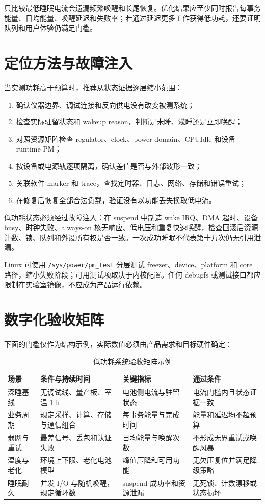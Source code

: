 只比较最低睡眠电流会遗漏频繁唤醒和长尾恢复。优化结果应至少同时报告每事务能量、日均能量、唤醒延迟和失败率；若通过延迟更多工作获得低功耗，还要证明队列和用户体验仍满足门槛。

\section{定位方法与故障注入}

当实测功耗高于预算时，推荐从状态证据逐层缩小范围：

\begin{enumerate}
  \item 确认仪器边界、调试连接和反向供电没有改变被测系统；
  \item 检查实际驻留状态和 wakeup reason，判断是未睡、浅睡还是立即唤醒；
  \item 对照资源矩阵检查 regulator、clock、power domain、CPUIdle 和设备 runtime PM；
  \item 按设备或电源轨逐项隔离，确认差值是否与外部波形一致；
  \item 关联软件 marker 和 trace，查找定时器、日志、网络、存储和错误重试；
  \item 在修复后恢复全部合法负载，验证没有以功能丢失换取低电流。
\end{enumerate}

低功耗状态必须经过故障注入：在 suspend 中制造 wake IRQ、DMA 超时、设备 busy、时钟失败、always-on 核无响应、低电压和重复快速唤醒，检查回滚后资源计数、锁、队列和外设所有权是否一致。一次成功睡眠不代表第十万次仍无引用泄漏。

Linux 可使用 \texttt{/sys/power/pm\_test} 分层测试 freezer、device、platform 和 core 路径，缩小失败阶段；可用测试项取决于内核配置。任何 debugfs 或测试接口都应限制在实验室镜像，不应成为产品运行依赖。

\section{数字化验收矩阵}

下面的门槛仅作为结构示例，实际数值必须由产品需求和目标硬件确定：

\begin{table}[H]
  \centering
  \caption{低功耗系统验收矩阵示例}
  \begin{tabular}{p{27mm}p{43mm}p{30mm}p{28mm}}
    \hline
    场景 & 条件与持续时间 & 关键指标 & 通过条件 \\
    \hline
    深睡基线 & 无调试线、量产板、室温 1 h & 电池侧电流与驻留状态 & 电流门槛内且状态证据一致 \\
    业务周期 & 规定采样、计算、存储与通信组合 & 每事务能量与完成时间 & 能量和延迟均不超预算 \\
    弱网与重试 & 最差信号、丢包和认证失败 & 日均能量与唤醒次数 & 不形成无界重试或唤醒风暴 \\
    温度与老化 & 环境上下限、老化电池模型 & 峰值压降和可用功能 & 无欠压复位并满足降级策略 \\
    睡眠耐久 & 并发 I/O 与随机唤醒，规定循环数 & suspend 成功率和资源泄漏 & 无死锁、计数漂移或状态损坏 \\
    \hline
  \end{tabular}
\end{table}

